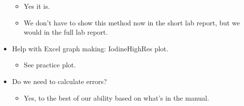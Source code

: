 \documentclass[../notes.tex]{subfiles}
\begin{document}
\begin{itemize}
    \begin{itemize}
        \item Yes it is.
        \item We don't have to show this method now in the short lab report, but we would in the full lab report.
    \end{itemize}
    \item Help with Excel graph making: IodineHighRes plot.
    \begin{itemize}
        \item See practice plot.
    \end{itemize}
    \item Do we need to calculate errors?
    \begin{itemize}
        \item Yes, to the best of our ability based on what's in the manual.
    \end{itemize}
\end{itemize}
\end{document}

